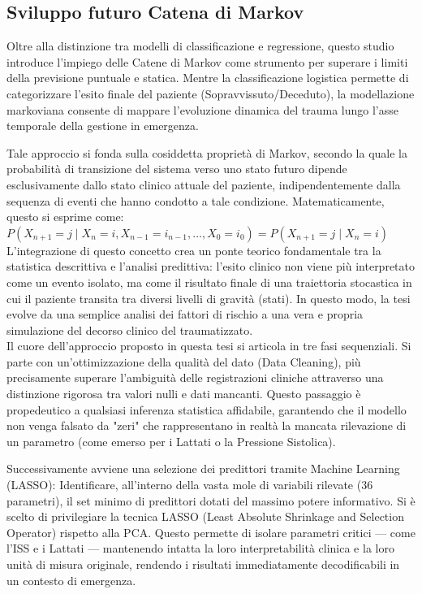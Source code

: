 \documentclass[11pt, oneside, noexaminfo]{sapthesis}   	%
\begin{document}
\subsection{Sviluppo futuro Catena di Markov}
Oltre alla distinzione tra modelli di classificazione e regressione, questo studio introduce l'impiego delle Catene di Markov come strumento per superare i limiti della previsione puntuale e statica. Mentre la classificazione logistica permette di categorizzare l'esito finale del paziente (Sopravvissuto/Deceduto), la modellazione markoviana consente di mappare l'evoluzione dinamica del trauma lungo l'asse temporale della gestione in emergenza.

Tale approccio si fonda sulla cosiddetta proprietà di Markov, secondo la quale la probabilità di transizione del sistema verso uno stato futuro dipende esclusivamente dallo stato clinico attuale del paziente, indipendentemente dalla sequenza di eventi che hanno condotto a tale condizione. Matematicamente, questo si esprime come:\\

$P(X_{n+1}=j \mid X_n=i, X_{n-1}=i_{n-1}, \dots, X_0=i_0) = P(X_{n+1}=j \mid X_n=i)$\\

L'integrazione di questo concetto crea un ponte teorico fondamentale tra la statistica descrittiva e l'analisi predittiva: l'esito clinico non viene più interpretato come un evento isolato, ma come il risultato finale di una traiettoria stocastica in cui il paziente transita tra diversi livelli di gravità (stati). In questo modo, la tesi evolve da una semplice analisi dei fattori di rischio a una vera e propria simulazione del decorso clinico del traumatizzato.\\

Il cuore dell'approccio proposto in questa tesi si articola in tre fasi sequenziali. Si parte con un'ottimizzazione della qualità del dato (Data Cleaning), più precisamente superare l'ambiguità delle registrazioni cliniche attraverso una distinzione rigorosa tra valori nulli e dati mancanti. Questo passaggio è propedeutico a qualsiasi inferenza statistica affidabile, garantendo che il modello non venga falsato da "zeri" che rappresentano in realtà la mancata rilevazione di un parametro (come emerso per i Lattati o la Pressione Sistolica).\

Successivamente avviene una selezione dei predittori tramite Machine Learning (LASSO): Identificare, all'interno della vasta mole di variabili rilevate (36 parametri), il set minimo di predittori dotati del massimo potere informativo. Si è scelto di privilegiare la tecnica LASSO (Least Absolute Shrinkage and Selection Operator) \cite{tibshirani1996lasso} rispetto alla PCA. Questo permette di isolare parametri critici — come l'ISS e i Lattati — mantenendo intatta la loro interpretabilità clinica e la loro unità di misura originale, rendendo i risultati immediatamente decodificabili in un contesto di emergenza.\\
\end{document}
